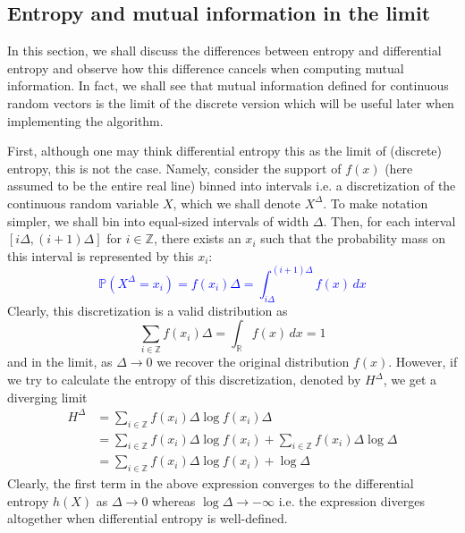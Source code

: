 \documentclass[../Thesis.tex]{subfiles}
\begin{document}
\subsection{Entropy and mutual information in the limit}\label{subsec:limit entropy and MI}
In this section, we shall discuss the differences between entropy and differential entropy and observe how this difference cancels when computing mutual information. In fact, we shall see that mutual information defined for continuous random vectors is the limit of the discrete version which will be useful later when implementing the algorithm.

First, although one may think differential entropy this as the limit of (discrete) entropy, this is not the case. Namely, consider the support of $f(x)$ (here assumed to be the entire real line) binned into intervals i.e. a discretization of the continuous random variable $X$, which we shall denote $X^{\Delta}$. To make notation simpler, we shall bin into equal-sized intervals of width $\Delta$. Then, for each interval $[i\Delta, (i+1)\Delta]$ for $i \in \mathbb{Z}$, there exists an $x_i$ such that the probability mass on this interval is represented by this $x_i$:
\textcolor{blue}{
    \begin{equation}\label{eq:one dim discretization}
        \mathbb{P}\left(X^{\Delta} = x_i\right) = f(x_i) \Delta = \int_{i\Delta}^{(i+1)\Delta} f(x) \, dx
    \end{equation}
}
Clearly, this discretization is a valid distribution as
$$\sum_{i\in\mathbb{Z}} f(x_i) \Delta = \int_{\mathbb{R}} f(x) \, dx = 1$$
and in the limit, as $\Delta \to 0$ we recover the original distribution $f(x)$. However, if we try to calculate the entropy of this discretization, denoted by $H^{\Delta}$, we get a diverging limit
\begin{align*}
    H^{\Delta} & = \sum_{i\in\mathbb{Z}} f(x_i) \Delta \log{f(x_i) \Delta}                                             \\
               & = \sum_{i\in\mathbb{Z}} f(x_i) \Delta \log{f(x_i)} + \sum_{i\in\mathbb{Z}} f(x_i) \Delta \log{\Delta} \\
               & = \sum_{i\in\mathbb{Z}} f(x_i) \Delta \log{f(x_i)} + \log{\Delta}
\end{align*}
Clearly, the first term in the above expression converges to the differential entropy $h\left(X\right)$ as $\Delta \to 0$ whereas $\log{\Delta} \to - \infty$ i.e. the expression diverges altogether when differential entropy is well-defined.
\end{document}
